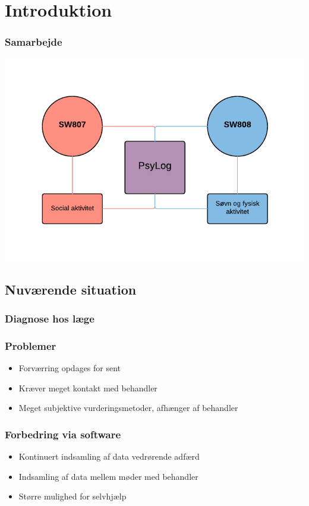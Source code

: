 \section{Introduktion}

\begin{frame}
\frametitle{Samarbejde}

\includegraphics[width=\textwidth]{graphics/samarbejde.pdf}

\end{frame}

\subsection{Nuværende situation}

\begin{frame}
\frametitle{Diagnose hos læge}

\end{frame}

\begin{frame}
\frametitle{Problemer}
\begin{itemize}
\item Forværring opdages for sent
\item Kræver meget kontakt med behandler
\item Meget subjektive vurderingsmetoder, afhænger af behandler
\end{itemize}

\end{frame}

\begin{frame}
\frametitle{Forbedring via software}

\begin{itemize}
\item Kontinuert indsamling af data vedrørende adfærd
\item Indsamling af data mellem møder med behandler
\item Større mulighed for selvhjælp
\end{itemize}

\end{frame}
